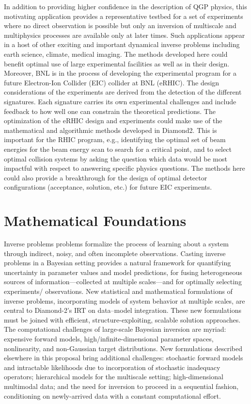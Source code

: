 \documentclass[11pt]{article}
\begin{document}
In addition to providing higher confidence in the description of QGP
physics, this motivating application provides a representative testbed
for a set of experiments where no direct observation is possible but
only an inversion of multiscale and multiphysics processes are
available only at later times.  Such applications appear in a host of
other exciting and important dynamical inverse problems including
earth science, climate, medical imaging. The methods developed here
could benefit optimal use of large experimental facilities as well as
in their design.  Moreover, BNL is in the process of developing the
experimental program for a future Electron-Ion Collider (EIC) collider
at BNL (eRHIC). The design considerations of the experiments are
derived from the detection of the different signatures. Each signature
carries its own experimental challenges and include feedback to how
well one can constrain the theoretical predictions.  The optimization
of the eRHIC design and experiments could make use of the mathematical
and algorithmic methods developed in Diamond2.  This is important for
the RHIC program, e.g., identifying the optimal set of beam energies
for the beam energy scan to search for a critical point, and to select
optimal collision systems by asking the question which data would be
most impactful with respect to answering specific physics questions.
The methods here could also provide a breakthrough for the design of
optimal detector configurations (acceptance, solution, etc.) for
future EIC experiments.

\section{Mathematical Foundations}

Inverse problems problems formalize the process of learning about a
system through indirect, noisy, and often incomplete
observations. Casting inverse problems in a Bayesian setting provides
a natural framework for quantifying uncertainty in parameter values
and model predictions, for fusing heterogeneous sources of
information—collected at multiple scales—and for optimally selecting
experiments/ observations. New statistical and mathematical
formulations of inverse problems, incorporating models of system
behavior at multiple scales, are central to Diamond-2’s IRT on
data–model integration.  These new formulations must be joined with
efficient, structure-exploiting, scalable solution approaches.  The
computational challenges of large-scale Bayesian inversion are myriad:
expensive forward models, high/infinite-dimensional parameter spaces,
nonlinearity, and non-Gaussian target distributions. New formulations
described elsewhere in this proposal bring additional challenges:
stochastic forward models and intractable likelihoods due to
incorporation of stochastic inadequacy operators; hierarchical models
for the multiscale setting; high-dimensional multimodal data; and the
need for inversion to proceed in a sequential fashion, conditioning on
newly-arrived data with a constant computational effort.
\end{document}
